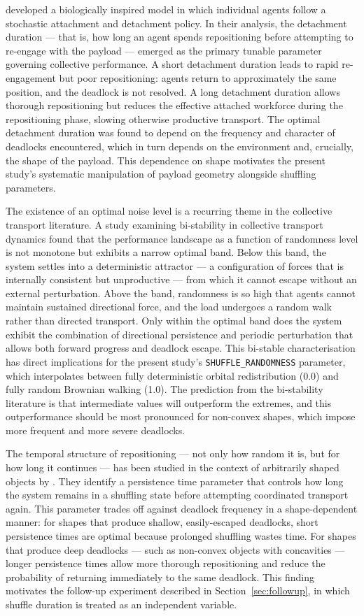\citet{wilson2014} developed a biologically inspired model in which individual agents follow a stochastic attachment and detachment policy. In their analysis, the detachment duration — that is, how long an agent spends repositioning before attempting to re-engage with the payload — emerged as the primary tunable parameter governing collective performance. A short detachment duration leads to rapid re-engagement but poor repositioning: agents return to approximately the same position, and the deadlock is not resolved. A long detachment duration allows thorough repositioning but reduces the effective attached workforce during the repositioning phase, slowing otherwise productive transport. The optimal detachment duration was found to depend on the frequency and character of deadlocks encountered, which in turn depends on the environment and, crucially, the shape of the payload. This dependence on shape motivates the present study's systematic manipulation of payload geometry alongside shuffling parameters.

The existence of an optimal noise level is a recurring theme in the collective transport literature. A study examining bi-stability in collective transport dynamics \citep{yin2025} found that the performance landscape as a function of randomness level is not monotone but exhibits a narrow optimal band. Below this band, the system settles into a deterministic attractor — a configuration of forces that is internally consistent but unproductive — from which it cannot escape without an external perturbation. Above the band, randomness is so high that agents cannot maintain sustained directional force, and the load undergoes a random walk rather than directed transport. Only within the optimal band does the system exhibit the combination of directional persistence and periodic perturbation that allows both forward progress and deadlock escape. This bi-stable characterisation has direct implications for the present study's \texttt{SHUFFLE\_RANDOMNESS} parameter, which interpolates between fully deterministic orbital redistribution (0.0) and fully random Brownian walking (1.0). The prediction from the bi-stability literature is that intermediate values will outperform the extremes, and this outperformance should be most pronounced for non-convex shapes, which impose more frequent and more severe deadlocks.

The temporal structure of repositioning — not only how random it is, but for how long it continues — has been studied in the context of arbitrarily shaped objects by \citet{springer2022}. They identify a persistence time parameter that controls how long the system remains in a shuffling state before attempting coordinated transport again. This parameter trades off against deadlock frequency in a shape-dependent manner: for shapes that produce shallow, easily-escaped deadlocks, short persistence times are optimal because prolonged shuffling wastes time. For shapes that produce deep deadlocks — such as non-convex objects with concavities — longer persistence times allow more thorough repositioning and reduce the probability of returning immediately to the same deadlock. This finding motivates the follow-up experiment described in Section~\ref{sec:followup}, in which shuffle duration is treated as an independent variable.

